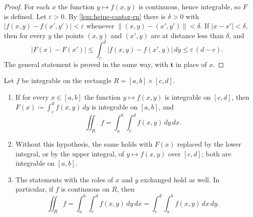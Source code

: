 \begin{proof}
For each $x$ the function $y\mapsto f(x,y)$ is continuous, hence integrable, so $F$ is defined. Let $\varepsilon>0$. By \cref{lem:heine-cantor-rn} there is $\delta>0$ with $|f(x,y)-f(x',y')|<\varepsilon$ whenever $\|(x,y)-(x',y')\|<\delta$. If $|x-x'|<\delta$, then for every $y$ the points $(x,y)$ and $(x',y)$ are at distance less than $\delta$, and
\[
|F(x)-F(x')|\le\int_c^d|f(x,y)-f(x',y)|\,dy\le\varepsilon\,(d-c).
\]
The general statement is proved in the same way, with $\mathbf t$ in place of $x$.
\end{proof}

\begin{theorem}
\label{thm:fubini}
Let $f$ be integrable on the rectangle $R=[a,b]\times[c,d]$.
\begin{enumerate}
\item If for every $x\in[a,b]$ the function $y\mapsto f(x,y)$ is integrable on $[c,d]$, then $F(x)\coloneqq\int_c^df(x,y)\,dy$ is integrable on $[a,b]$, and
\[
\iint_Rf=\int_a^b\int_c^df(x,y)\,dy\,dx .
\]
\item Without this hypothesis, the same holds with $F(x)$ replaced by the lower integral, or by the upper integral, of $y\mapsto f(x,y)$ over $[c,d]$; both are integrable on $[a,b]$.
\item The statements with the roles of $x$ and $y$ exchanged hold as well. In particular, if $f$ is continuous on $R$, then
\[
\iint_Rf=\int_a^b\int_c^df(x,y)\,dy\,dx=\int_c^d\int_a^bf(x,y)\,dx\,dy .
\]
\end{enumerate}
\end{theorem}

